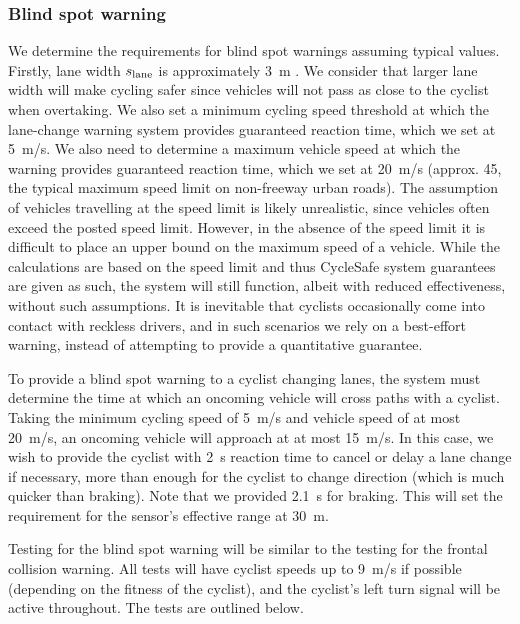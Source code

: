 \documentclass[journal]{IEEEtran}
\begin{document}
\subsubsection{Blind spot warning}
We determine the requirements for blind spot warnings assuming typical values. Firstly, lane width $s_\text{lane}$ is approximately \SI{3}{\meter} \cite{lane_width}. We consider that larger lane width will make cycling safer since vehicles will not pass as close to the cyclist when overtaking. We also set a minimum cycling speed threshold at which the lane-change warning system provides guaranteed reaction time, which we set at \SI{5}{\meter/\s}. We also need to determine a maximum vehicle speed at which the warning provides guaranteed reaction time, which we set at \SI{20}{\meter/\s} (approx. \SI{45}{\mph}, the typical maximum speed limit on non-freeway urban roads). %
The assumption of vehicles travelling at the speed limit is likely unrealistic, since vehicles often exceed the posted speed limit. However, in the absence of the speed limit it is difficult to place an upper bound on the maximum speed of a vehicle. While the calculations are based on the speed limit and thus CycleSafe system guarantees are given as such, the system will still function, albeit with reduced effectiveness, without such assumptions. It is inevitable that cyclists occasionally come into contact with reckless drivers, and in such scenarios we rely on a best-effort warning, instead of attempting to provide a quantitative guarantee.

To provide a blind spot warning to a cyclist changing lanes, the system must determine the time at which an oncoming vehicle will cross paths with a cyclist. Taking the minimum cycling speed of \SI{5}{\meter/\s} and vehicle speed of at most \SI{20}{\meter/\s}, an oncoming vehicle will approach at at most \SI{15}{\meter/\s}. In this case, we wish to provide the cyclist with \SI{2}{\s} reaction time to cancel or delay a lane change if necessary, more than enough for the cyclist to change direction (which is much quicker than braking). Note that we provided \SI{2.1}{s} for braking. This will set the requirement for the sensor's effective range at \SI{30}{\meter}.

Testing for the blind spot warning will be similar to the testing for the frontal collision warning. All tests will have cyclist speeds up to \SI{9}{\meter/\s} if possible (depending on the fitness of the cyclist), and the cyclist's left turn signal will be active throughout. The tests are outlined below.
\end{document}
